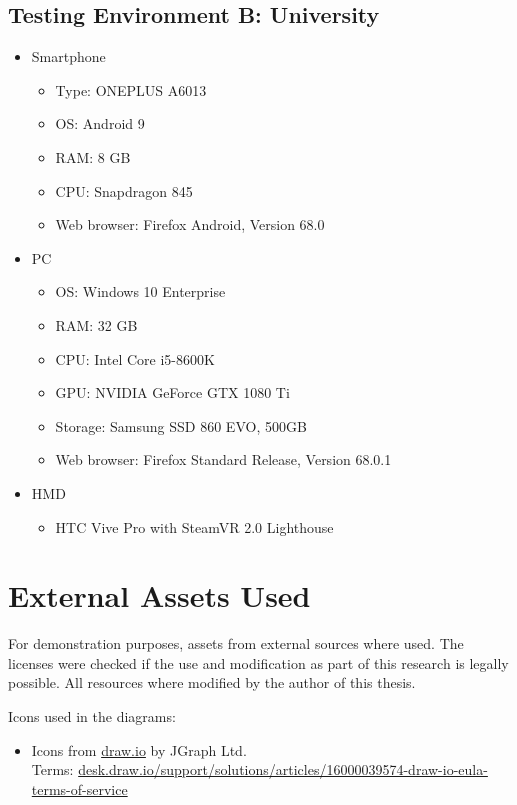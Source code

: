 \begin{appendices}
  \section{Testing Environment B: University}
  \begin{itemize}
    \item Smartphone
    \begin{itemize}
      \item Type: ONEPLUS A6013
      \item \ac{OS}: Android 9
      \item RAM: 8 GB
      \item CPU: Snapdragon 845 %
      \item Web browser: Firefox Android, Version 68.0
    \end{itemize}
    \item \ac{PC}
    \begin{itemize}
      \item \ac{OS}: Windows 10 Enterprise
      \item RAM: 32 GB
      \item CPU: Intel Core i5-8600K %
      \item GPU: NVIDIA GeForce GTX 1080 Ti
      \item Storage: Samsung SSD 860 EVO, 500GB
      \item Web browser: Firefox Standard Release, Version 68.0.1
    \end{itemize}
    \item \ac{HMD}
    \begin{itemize}
      \item HTC Vive Pro with SteamVR 2.0 Lighthouse
    \end{itemize}
  \end{itemize}

  \chapter{External Assets Used}\label{chapter:external-assets-used}
  
  For demonstration purposes, assets from external sources where used. The licenses were checked if the use and modification as part of this research is legally possible. All resources where modified by the author of this thesis.

  Icons used in the diagrams:
  \begin{itemize}
    \item Icons from \href{https://www.draw.io/}{draw.io} by JGraph Ltd.\\Terms: \href{https://desk.draw.io/support/solutions/articles/16000039574-draw-io-eula-terms-of-service}{desk.draw.io/support/solutions/articles/16000039574-draw-io-eula-terms-of-service}
  \end{itemize}


\end{appendices}
